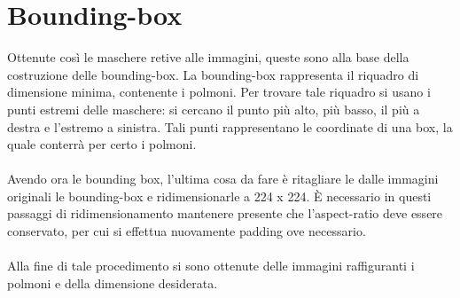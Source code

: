 \section{Bounding-box}
Ottenute così le maschere retive alle immagini, queste sono alla base della costruzione delle bounding-box.
La bounding-box rappresenta il riquadro di dimensione minima, contenente i polmoni.
Per trovare tale riquadro si usano i punti estremi delle maschere: si cercano il punto più alto, più basso, il più a destra e l'estremo a sinistra.
Tali punti rappresentano le coordinate di una box, la quale conterrà per certo i polmoni.
\\\\
Avendo ora le bounding box, l'ultima cosa da fare è ritagliare le dalle immagini originali le bounding-box e ridimensionarle a 224 x 224.
È necessario in questi passaggi di ridimensionamento mantenere presente che l'aspect-ratio deve essere conservato, per cui si effettua nuovamente padding ove necessario.
\\\\
Alla fine di tale procedimento si sono ottenute delle immagini raffiguranti i polmoni e della dimensione desiderata.

